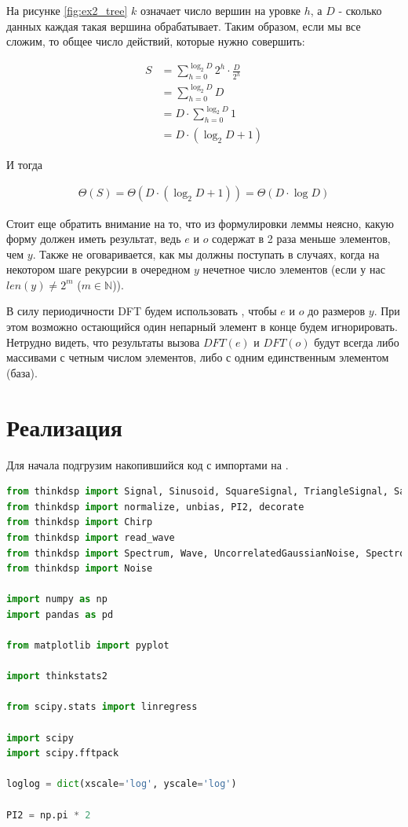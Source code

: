 \documentclass[a4paper,12pt]{report}
\begin{document}
    На рисунке \ref{fig:ex2_tree} $k$ означает число вершин на уровке $h$, а $D$ - сколько данных каждая такая вершина обрабатывает. Таким образом, если мы все сложим, то общее число действий, которые нужно совершить:

    \begin{align*}
        S
        &= \sum_{h=0}^{\log_2D} 2^h\cdot\frac{D}{2^h} \\
        &= \sum_{h=0}^{\log_2D} D \\
        &= D\cdot \sum_{h=0}^{\log_2D} 1 \\
        &= D\cdot (\log_2D + 1)
    \end{align*}
    
    И тогда
    
    \begin{align*}
        \Theta(S)
        = \Theta(D\cdot (\log_2D + 1))
        = \Theta(D\cdot \log D)
    \end{align*}
    
    Стоит еще обратить внимание на то, что из формулировки леммы неясно, какую форму должен иметь результат, ведь $e$ и $o$ содержат в 2 раза меньше элементов, чем $y$. Также не оговаривается, как мы должны поступать в случаях, когда на некотором шаге рекурсии в очередном $y$ нечетное число элементов (если у нас $len(y) \neq 2^m$ ($m\in\mathbb{N}$)). 
    
    В силу периодичности DFT будем использовать , чтобы  $e$ и $o$ до размеров $y$. При этом возможно остающийся один непарный элемент в конце будем игнорировать. Нетрудно видеть, что результаты вызова $DFT(e)$ и $DFT(o)$ будут всегда либо массивами с четным числом элементов, либо с одним единственным элементом (база).
    
    \section{Реализация}
    
    Для начала подгрузим накопившийся код с импортами на .
    
\begin{lstlisting}[language=Python,caption=Импорты]
from thinkdsp import Signal, Sinusoid, SquareSignal, TriangleSignal, SawtoothSignal, ParabolicSignal
from thinkdsp import normalize, unbias, PI2, decorate
from thinkdsp import Chirp
from thinkdsp import read_wave
from thinkdsp import Spectrum, Wave, UncorrelatedGaussianNoise, Spectrogram
from thinkdsp import Noise

import numpy as np
import pandas as pd

from matplotlib import pyplot

import thinkstats2

from scipy.stats import linregress

import scipy
import scipy.fftpack

loglog = dict(xscale='log', yscale='log')

PI2 = np.pi * 2
\end{lstlisting}
\end{document}

